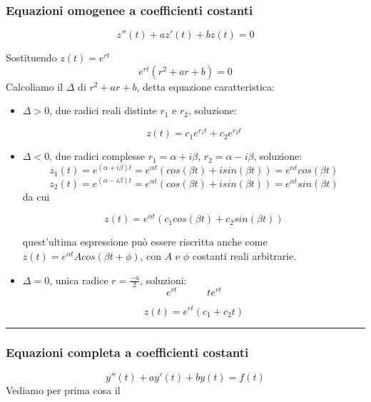 \subsubsection{Equazioni omogenee a coefficienti costanti}
\begin{tcolorbox}
\[
    z''(t) + a z'(t) + bz(t) = 0
\]
\end{tcolorbox}
Sostituendo $z(t) = e^{rt}$
\[
    e^{rt}(r^2 + a r + b) = 0
\]
Calcoliamo il $\Delta$ di $r^2 + a r + b$, detta equazione caratteristica:
\begin{itemize}
    \item $\Delta>0$, due radici reali distinte $r_1$ e $r_2$, soluzione:
    \begin{tcolorbox}
    \[
        z(t) = c_1e^{r_1t} + c_2e^{r_2t}
    \]
    \end{tcolorbox}
    \item $\Delta <0$, due radici complesse $r_1 =\alpha + i \beta$, $r_2 = \alpha - i \beta$, soluzione:
    \[
        z_1(t) = e^{(\alpha + i \beta)t} =e^{\alpha t} (cos(\beta t) + i sin(\beta t)) = e^{\alpha t} cos(\beta t)
    \]
    \[
        z_2(t) = e^{(\alpha-i \beta)t} = e^{\alpha t}(cos(\beta t) + i sin(\beta t)) = e^{\alpha t} sin (\beta t)
    \]
    da cui
    \begin{tcolorbox}
    \[
        z(t) = e^{\alpha t}(c_1 cos(\beta t) + c_2 sin (\beta t))
    \]
    \end{tcolorbox}
    quest'ultima espressione può essere riscritta anche come $z(t) = e^{\alpha t} A cos(\beta t + \phi)$, con $A$ e $\phi$ costanti reali arbitrarie.
    \item $\Delta = 0$, unica radice $r=\frac{-a}{2}$, soluzioni:
    \[
        e^{rt} \quad \quad \quad te^{rt}
    \] 
    \begin{tcolorbox}
    \[
        z(t) = e^{rt}(c_1 + c_2 t)
    \]
    \end{tcolorbox}
\end{itemize}
\rule{\textwidth}{0,4pt}
\subsubsection{Equazioni completa a coefficienti costanti}
\[
    y''(t) + a y'(t) + b y(t) = f(t)
\]
Vediamo per prima cosa il 
